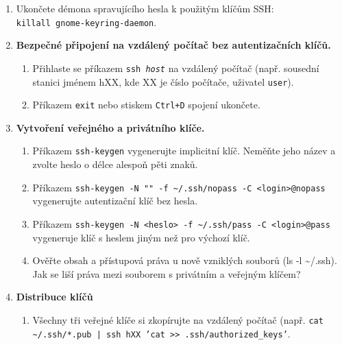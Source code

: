 \begin{enumerate}

  \item Ukončete démona spravujícího hesla k použitým klíčům SSH: \\ {\tt killall
    gnome-keyring-daemon}.

  \item {\bf Bezpečné připojení na vzdálený počítač bez autentizačních klíčů.}

    \begin{enumerate}

      \item Přihlaste se příkazem {\tt ssh {\em host}} na vzdálený počítač (např.
        sousední stanici jménem hXX, kde XX je číslo počítače, uživatel {\tt user}).

      \item Příkazem {\tt exit} nebo stiskem {\tt Ctrl+D} spojení ukončete.

    \end{enumerate}

  \item {\bf Vytvoření veřejného a privátního klíče.}

    \begin{enumerate}

      \item Příkazem {\tt ssh-keygen} vygenerujte implicitní klíč. Neměňte jeho
        název a zvolte heslo o délce alespoň pěti znaků.

      \item Příkazem \verb|ssh-keygen -N "" -f ~/.ssh/nopass -C <login>@nopass| vygenerujte autentizační klíč bez hesla.

      \item Příkazem {\tt ssh-keygen -N <heslo> -f \textasciitilde/.ssh/pass -C
        <login>@pass} vygeneruje klíč s heslem jiným než pro výchozí klíč.

      \item Ověřte obsah a přístupová práva u nově vzniklých souborů (ls -l \textasciitilde/.ssh). Jak
se liší práva mezi souborem s privátním a veřejným klíčem?

    \end{enumerate}

  \item {\bf Distribuce klíčů}

    \begin{enumerate}

      \item Všechny tři veřejné klíče si zkopírujte na vzdálený počítač
        (např. {\tt  cat \textasciitilde/.ssh/*.pub | ssh hXX 'cat >>
        .ssh/authorized\_keys'}.


\end{enumerate}
\end{enumerate}
